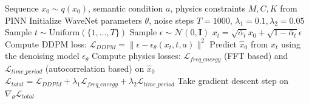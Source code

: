 \documentclass[journal]{IEEEtran}
\begin{document}
\begin{algorithm}[h]
\caption{PC-Diffusion Training}
\label{alg:train}
\begin{algorithmic}[1]
\REQUIRE Sequence $x_0 \sim q(x_0)$, semantic condition $a$, physics constraints $M,C,K$ from PINN
\STATE Initialize WaveNet parameters $\theta$, noise steps $T=1000$, $\lambda_1=0.1, \lambda_2=0.05$
\REPEAT
    \STATE Sample $t \sim \text{Uniform}(\{1, \dots, T\})$
    \STATE Sample $\epsilon \sim \mathcal{N}(0, \mathbf{I})$
    \STATE $x_t = \sqrt{\bar{\alpha}_t}x_0 + \sqrt{1-\bar{\alpha}_t}\epsilon$
    \STATE Compute DDPM loss: $\mathcal{L}_{DDPM} = \| \epsilon - \epsilon_\theta(x_t, t, a) \|^2$
    \STATE Predict $\hat{x}_0$ from $x_t$ using the denoising model $\epsilon_\theta$
    \STATE Compute physics losses: $\mathcal{L}_{freq\_energy}$ (FFT based) and $\mathcal{L}_{time\_period}$ (autocorrelation based) on $\hat{x}_0$
    \STATE $\mathcal{L}_{total} = \mathcal{L}_{DDPM} + \lambda_1 \mathcal{L}_{freq\_energy} + \lambda_2 \mathcal{L}_{time\_period}$
    \STATE Take gradient descent step on $\nabla_\theta \mathcal{L}_{total}$
\end{algorithmic}
\end{algorithm}
\end{document}

